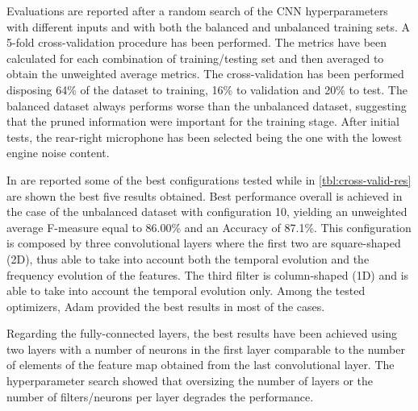 Evaluations are reported after a random search of the CNN hyperparameters with different inputs and with both the balanced and unbalanced training sets. A 5-fold cross-validation procedure has been performed. The metrics have been calculated for each combination of training/testing set and then averaged to obtain the unweighted average metrics. The cross-validation has been performed disposing 64\% of the dataset to training, 16\% to validation and 20\% to test. The balanced dataset always performs worse than the unbalanced dataset, suggesting that the pruned information were important for the training stage. After initial tests, the rear-right microphone has been selected being the one with the lowest engine noise content.


In  are reported some of the best configurations tested while in \ref{tbl:cross-valid-res} are shown the best five results obtained. Best performance overall is achieved in the case of the unbalanced dataset with configuration 10, yielding an unweighted average F-measure equal to 86.00\% and an Accuracy of 87.1\%. 
This configuration is composed by three convolutional layers where the first two are square-shaped (2D), thus able to take into account both the temporal evolution and the frequency evolution of the features. The third filter is column-shaped (1D) and is able to take into account the temporal evolution only. Among the tested optimizers, Adam \cite{Kingma2015adam} provided the best results in most of the cases.

Regarding the fully-connected layers, the best results have been achieved using two layers with a number of neurons in the first layer comparable to the number of elements of the feature map obtained from the last convolutional layer. The hyperparameter search showed that oversizing the number of layers or the number of filters/neurons per layer degrades the performance.


